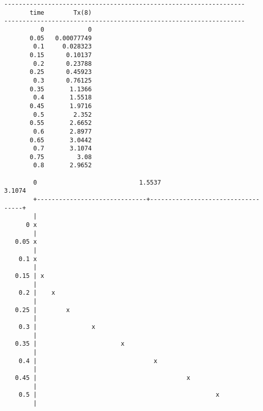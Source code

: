 {\small
\begin{screen}
 \begin{verbatim}
------------------------------------------------------------------
       time        Tx(8)
------------------------------------------------------------------
          0            0
       0.05   0.00077749
        0.1     0.028323
       0.15      0.10137
        0.2      0.23788
       0.25      0.45923
        0.3      0.76125
       0.35       1.1366
        0.4       1.5518
       0.45       1.9716
        0.5        2.352
       0.55       2.6652
        0.6       2.8977
       0.65       3.0442
        0.7       3.1074
       0.75         3.08
        0.8       2.9652

        0                            1.5537                           3.1074
        +------------------------------+-----------------------------------+
        |                                                                   
      0 x                                                                   
        |                                                                   
   0.05 x                                                                   
        |                                                                   
    0.1 x                                                                   
        |                                                                   
   0.15 | x                                                                 
        |                                                                   
    0.2 |    x                                                              
        |                                                                   
   0.25 |        x                                                          
        |                                                                   
    0.3 |               x                                                   
        |                                                                   
   0.35 |                       x                                           
        |                                                                   
    0.4 |                                x                                  
        |                                                                   
   0.45 |                                         x                         
        |                                                                   
    0.5 |                                                 x                 
        |                                                                   

\end{verbatim}
\end{screen}}
